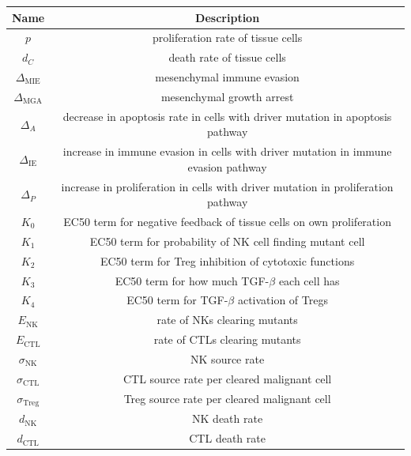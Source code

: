 \documentclass[11pt]{article}
\begin{document}
\begin{table}[H]
\begin{center}
 \begin{tabular}{|| c | c ||} 
 \hline
 {\bf Name} & {\bf Description}  \\ [0.5ex] 
 \hline
 $p$ & proliferation rate of tissue cells \\ 
 \hline
 $d_C$  & death rate of tissue cells \\
 \hline
$\Delta_\text{MIE}$ &  mesenchymal immune evasion \\
 \hline
 $\Delta_\text{MGA}$ & mesenchymal growth arrest    \\
 \hline
  $\Delta_A$ & decrease in apoptosis rate in cells with driver mutation in apoptosis pathway \\ %
  \hline
  $\Delta_\text{IE}$ & increase in immune evasion in cells with driver mutation in immune evasion pathway \\
  \hline
  $\Delta_P$ & increase in proliferation in cells with driver mutation in proliferation pathway\\
  \hline
 $K_0$ & EC50 term for negative feedback of tissue cells on own proliferation\\
 \hline
 $K_1$ & EC50 term for probability of NK cell finding mutant cell\\
 \hline
  $K_2$ & EC50 term for Treg inhibition of cytotoxic functions  \\
  \hline
  $K_3$ & EC50 term for how much TGF-$\beta$ each cell has \\
  \hline
  $K_4$ & EC50 term for TGF-$\beta$ activation of Tregs \\
  \hline
 $E_\text{NK}$ & rate of NKs clearing mutants  \\
  \hline
  $E_\text{CTL}$ & rate of CTLs clearing mutants \\
  \hline
  $\sigma_\text{NK}$ & NK source rate \\ 
  \hline
  $\sigma_\text{CTL}$ & CTL source rate per cleared malignant cell \\ 
  \hline
  $\sigma_\text{Treg}$ & Treg source rate per cleared malignant cell \\ 
  \hline
  $d_\text{NK}$ & NK death rate \\ 
  \hline
  $d_\text{CTL}$ & CTL death rate \\ 

\end{tabular}
\end{center}
\end{table}
\end{document}
